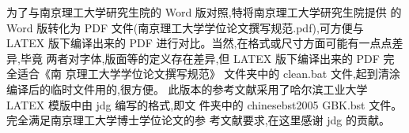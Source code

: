 为了与南京理工大学研究生院的 Word 版对照,特将南京理工大学研究生院提供 的 Word 版转化为 PDF 文件(南京理工大学学位论文撰写规范.pdf),可方便与 LATEX 版下编译出来的 PDF 进行对比。当然,在格式或尺寸方面可能有一点点差异,毕竟 两者对字体,版面等的定义存在差异,但 LATEX 版下编译出来的 PDF 完全适合《南 京理工大学学位论文撰写规范》
文件夹中的 clean.bat 文件,起到清涂编译后的临时文件用的,很方便。
此版本的参考文献采用了哈尔滨工业大学 LATEX 模版中由 jdg 编写的格式,即文 件夹中的 chinesebst2005 GBK.bst 文件。完全满足南京理工大学博士学位论文的参 考文献要求,在这里感谢 jdg 的贡献。
